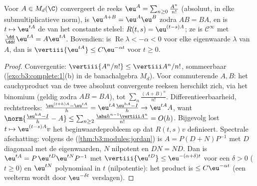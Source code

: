 \begin{theorem}[Matrixexponentiële]\label{thm:b3:ode:matrixexp}
Voor $A \in M_d(\C)$ convergeert de reeks $\eu^{A} =
\sum_{n\geq0}\frac{A^n}{n!}$ (absoluut, in elke
submultiplicatieve norm), is $\eu^{A+B} = \eu^A\eu^B$ zodra $AB =
BA$, en is $t \mapsto \eu^{tA}$ de  van het constante
stelsel: $R(t,s) = \eu^{(t-s)A}$; ze is $\mathcal C^\infty$ met
$\frac{\dd}{\dd t}\eu^{tA} = A\eu^{tA}$. Bovendien: is
$\operatorname{Re}\lambda < -\alpha < 0$ voor elke eigenwaarde
$\lambda$ van $A$, dan is $\vertiii{\eu^{tA}} \leq
C\eu^{-\alpha t}$ voor $t \geq 0$.
\end{theorem}

\begin{proof}
Convergentie: $\vertiii{A^n/n!} \leq \vertiii A^n/n!$,
sommeerbaar (\cref{exo:b3:complete:1}(b) in de banachalgebra
$M_d$). Voor commuterende $A, B$: het cauchyproduct van de twee
absoluut convergente reeksen herschikt zich, via het
binomium (geldig zodra $AB = BA$), tot
$\sum_n\frac{(A+B)^n}{n!}$. Differentieerbaarheid, rechtstreeks:
$\frac{\eu^{(t+h)A} - \eu^{tA}}h = \eu^{tA}\frac{\eu^{hA} - I}{h}
\to \eu^{tA}A$, want $\norm{\frac{\eu^{hA} - I}h - A} \leq
\sum_{n\geq2}\frac{\abs h^{n-1}\vertiii A^n}{n!} = O(h)$.
Bijgevolg lost $t \mapsto \eu^{(t - s)A}v$ het
beginwaardeprobleem op dat $R(t,s)v$ definieert. Spectrale
afschatting: volgens de 
(\cref{thm:b3:modules:jordan}) is $A = P(D + N)P^{-1}$ met $D$
diagonaal met de eigenwaarden, $N$ nilpotent en $DN = ND$. Dan is
$\eu^{tA} = P\,\eu^{tD}\eu^{tN}P^{-1}$ met $\vertiii{\eu^{tD}}
\leq \eu^{-(\alpha + \delta)t}$ voor een $\delta > 0$ ($t \geq
0$) en $\eu^{tN}$ polynomiaal in $t$ (nilpotentie): het product
is $\leq C\eu^{-\alpha t}$ (een veelterm wordt door
$\eu^{-\delta t}$ verslagen).
\end{proof}

